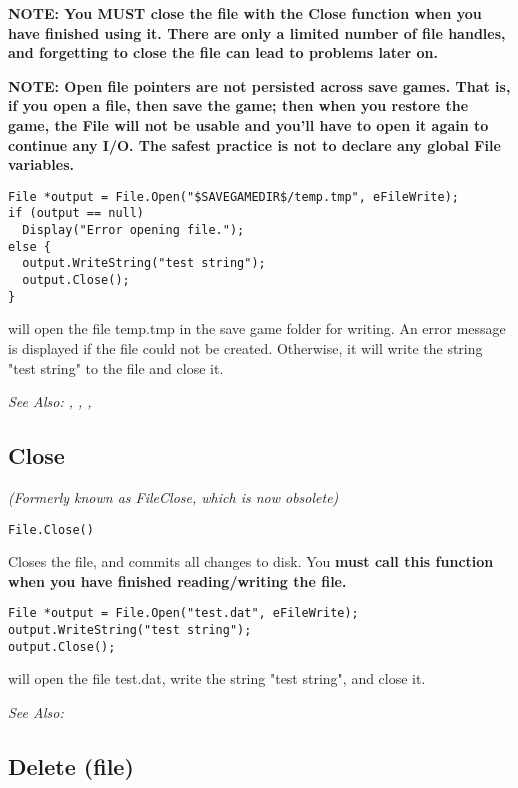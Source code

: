 \bf{NOTE:} You \bf{MUST} close the file with the Close function when you have finished
using it. There are only a limited number of file handles, and forgetting to
close the file can lead to problems later on.

\bf{NOTE:} Open file pointers are not persisted across save games. That is, if you open
a file, then save the game; then when you restore the game, the File will not be usable
and you'll have to open it again to continue any I/O. The safest practice is not to
declare any global File variables.

\begin{verbatim}
File *output = File.Open("$SAVEGAMEDIR$/temp.tmp", eFileWrite);
if (output == null)
  Display("Error opening file.");
else {
  output.WriteString("test string");
  output.Close();
}
\end{verbatim}
will open the file temp.tmp in the save game folder for writing. An error message is
displayed if the file could not be created. Otherwise, it will write the string "test string"
to the file and close it.

\it{See Also:} , ,
, 



\subsection{Close}\label{File.Close}%

\it{(Formerly known as FileClose, which is now obsolete)}

\begin{verbatim}
File.Close()
\end{verbatim}
Closes the file, and commits all changes to disk.
You \bf{must} call this function when you have finished reading/writing the file.

\begin{verbatim}
File *output = File.Open("test.dat", eFileWrite);
output.WriteString("test string");
output.Close();
\end{verbatim}
will open the file test.dat, write the string "test string", and close it.

\it{See Also:} 


\subsection{Delete (file)}\label{File.Delete}%

